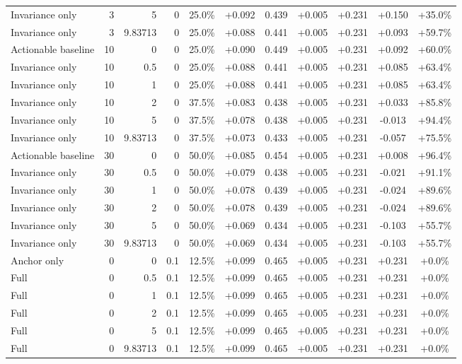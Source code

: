 \begin{table}[htbp]
\begin{tabular}{lrrrccccccc}
Invariance only & 3 & 5 & 0 & 25.0\% & +0.092 & 0.439 & +0.005 & +0.231 & +0.150 & +35.0\% \\
Invariance only & 3 & 9.83713 & 0 & 25.0\% & +0.088 & 0.441 & +0.005 & +0.231 & +0.093 & +59.7\% \\
Actionable baseline & 10 & 0 & 0 & 25.0\% & +0.090 & 0.449 & +0.005 & +0.231 & +0.092 & +60.0\% \\
Invariance only & 10 & 0.5 & 0 & 25.0\% & +0.088 & 0.441 & +0.005 & +0.231 & +0.085 & +63.4\% \\
Invariance only & 10 & 1 & 0 & 25.0\% & +0.088 & 0.441 & +0.005 & +0.231 & +0.085 & +63.4\% \\
Invariance only & 10 & 2 & 0 & 37.5\% & +0.083 & 0.438 & +0.005 & +0.231 & +0.033 & +85.8\% \\
Invariance only & 10 & 5 & 0 & 37.5\% & +0.078 & 0.438 & +0.005 & +0.231 & -0.013 & +94.4\% \\
Invariance only & 10 & 9.83713 & 0 & 37.5\% & +0.073 & 0.433 & +0.005 & +0.231 & -0.057 & +75.5\% \\
Actionable baseline & 30 & 0 & 0 & 50.0\% & +0.085 & 0.454 & +0.005 & +0.231 & +0.008 & +96.4\% \\
Invariance only & 30 & 0.5 & 0 & 50.0\% & +0.079 & 0.438 & +0.005 & +0.231 & -0.021 & +91.1\% \\
Invariance only & 30 & 1 & 0 & 50.0\% & +0.078 & 0.439 & +0.005 & +0.231 & -0.024 & +89.6\% \\
Invariance only & 30 & 2 & 0 & 50.0\% & +0.078 & 0.439 & +0.005 & +0.231 & -0.024 & +89.6\% \\
Invariance only & 30 & 5 & 0 & 50.0\% & +0.069 & 0.434 & +0.005 & +0.231 & -0.103 & +55.7\% \\
Invariance only & 30 & 9.83713 & 0 & 50.0\% & +0.069 & 0.434 & +0.005 & +0.231 & -0.103 & +55.7\% \\
Anchor only & 0 & 0 & 0.1 & 12.5\% & +0.099 & 0.465 & +0.005 & +0.231 & +0.231 & +0.0\% \\
Full & 0 & 0.5 & 0.1 & 12.5\% & +0.099 & 0.465 & +0.005 & +0.231 & +0.231 & +0.0\% \\
Full & 0 & 1 & 0.1 & 12.5\% & +0.099 & 0.465 & +0.005 & +0.231 & +0.231 & +0.0\% \\
Full & 0 & 2 & 0.1 & 12.5\% & +0.099 & 0.465 & +0.005 & +0.231 & +0.231 & +0.0\% \\
Full & 0 & 5 & 0.1 & 12.5\% & +0.099 & 0.465 & +0.005 & +0.231 & +0.231 & +0.0\% \\
Full & 0 & 9.83713 & 0.1 & 12.5\% & +0.099 & 0.465 & +0.005 & +0.231 & +0.231 & +0.0\% \\

\end{tabular}
\end{table}
